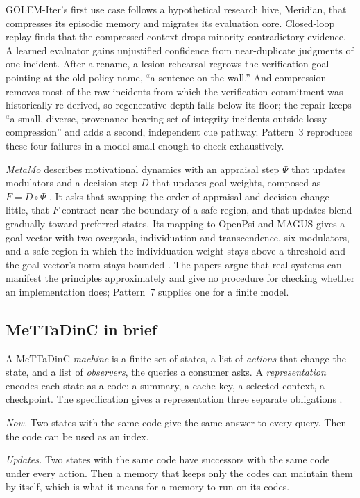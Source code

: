 \documentclass[11pt]{article}
\theoremstyle{definition}
\theoremstyle{plain}
\begin{document}
GOLEM-Iter's first use case follows a hypothetical research hive, Meridian, that compresses its
episodic memory and migrates its evaluation core. Closed-loop replay finds that the compressed context drops
minority contradictory evidence. A learned evaluator gains unjustified confidence from
near-duplicate judgments of one incident. After a rename, a lesion rehearsal regrows the
verification goal pointing at the old policy name, ``a sentence on the wall.'' And compression
removes most of the raw incidents from which the verification commitment was historically
re-derived, so regenerative depth falls below its floor; the repair keeps ``a small, diverse,
provenance-bearing set of integrity incidents outside lossy compression'' and adds a second,
independent cue pathway. Pattern~3 reproduces these four failures in a model small enough to check
exhaustively.

\emph{MetaMo} describes motivational dynamics with an appraisal step $\Psi$ that updates
modulators and a decision step $D$ that updates goal weights, composed as $F=D\circ\Psi$
\cite{metamo1}. It asks that swapping the order of appraisal and decision change little, that $F$
contract near the boundary of a safe region, and that updates blend gradually toward preferred
states. Its mapping to OpenPsi and MAGUS gives a goal vector with two overgoals, individuation and
transcendence, six modulators, and a safe region in which the individuation weight stays above a
threshold and the goal vector's norm stays bounded \cite{metamo2}. The papers argue that real
systems can manifest the principles approximately and give no procedure for checking whether an
implementation does; Pattern~7 supplies one for a finite model.

\subsection{MeTTaDinC in brief}\label{sec:mettadinc}

A MeTTaDinC \emph{machine} is a finite set of states, a list of \emph{actions} that change the state,
and a list of \emph{observers}, the queries a consumer asks. A \emph{representation} encodes each
state as a code: a summary, a cache key, a selected context, a checkpoint. The specification gives
a representation three separate obligations \cite[Section~4.2]{spec}.

\emph{Now.} Two states with the same code give the same answer to every query. Then the code
can be used as an index.

\emph{Updates.} Two states with the same code have successors with the same code under every
action. Then a memory that keeps only the codes can maintain them by itself, which is what it
means for a memory to run on its codes.
\end{document}
